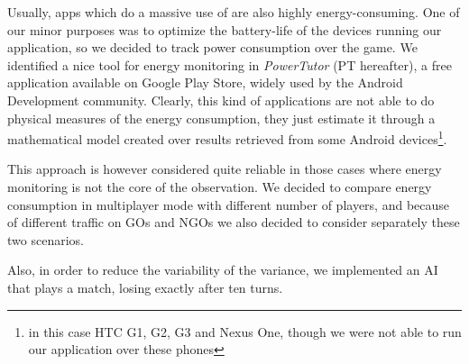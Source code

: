Usually, apps which do a massive use of \wifi{} are also highly energy-consuming. 
One of our minor purposes was to optimize the battery-life of the devices 
running our application, so we decided to track power consumption over the 
game. We identified a nice tool for energy monitoring in \textit{PowerTutor} 
(PT hereafter), a free application available on Google Play Store, widely used 
by the Android Development community. Clearly, this kind of applications are not 
able to do physical measures of the energy consumption, they just estimate it 
through a mathematical model created over results retrieved from some Android 
devices\footnote{in this case HTC G1, G2, G3 and Nexus One, though we were not 
able to run our application over these phones}.

This approach is however considered quite reliable in those cases where energy 
monitoring is not the core of the observation. We decided to compare energy 
consumption in multiplayer mode with different number of players, and because of 
different traffic on GOs and NGOs we also decided to consider separately these 
two scenarios.

Also, in order to reduce the variability of the variance, we implemented an AI
that plays a match, losing exactly after ten turns.
